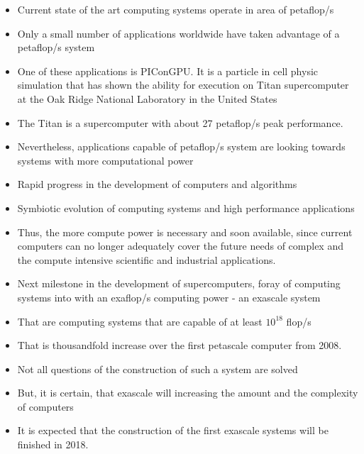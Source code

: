 \begin{itemize}

\item Current state of the art computing systems operate in area of
  petaflop/s
\item Only a small number of applications worldwide have taken advantage of a
  petaflop/s system
\item One of these applications is PIConGPU. It is a particle in cell
  physic simulation that has shown the ability for execution on Titan
  supercomputer at the Oak Ridge National Laboratory in the United
  States
\item The Titan is a supercomputer with about 27 petaflop/s peak
  performance.
\item Nevertheless, applications capable of petaflop/s system are looking towards systems
  with more computational power

\item Rapid progress in the development of computers and algorithms
\item Symbiotic evolution of computing systems and high performance
  applications
\item Thus, the more compute power is necessary and soon available,
  since current computers can no longer adequately cover the future
  needs of complex and the compute intensive scientific and industrial
  applications.
\item Next milestone in the development of supercomputers, foray of
  computing systems into with an exaflop/s computing power - an
  exascale system
\item That are computing systems that are capable of at least
  $10^{18}$ flop/s
\item That is thousandfold increase over the first petascale computer
  from 2008.
\item Not all questions of the construction of such a system are
  solved
\item But, it is certain, that exascale will increasing the amount and
  the complexity of computers
\item It is expected that the construction of the first exascale
  systems will be finished in 2018.


\end{itemize}
